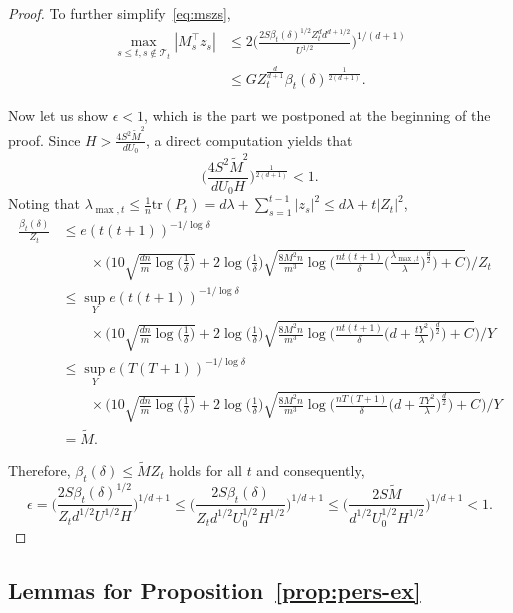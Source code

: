 \documentclass[11pt]{article}
\theoremstyle{plain}
\theoremstyle{definition}
\theoremstyle{remark}
\begin{document}
\begin{proof}
To further simplify~\eqref{eq:mszs}, 
\begin{align*}
     \max_{s\leq t,s\notin \mathcal{T}_{t}}|M_s^{\top}z_s|& \leq 2\bigg(\frac{2S\beta_t(\delta)^{1/2}Z_t^d d^{d+1/2}}{U^{1/2}}\bigg)^{1/(d+1)}\\
     &\leq GZ_t^{\frac{d}{d+1}}\beta_t(\delta)^{\frac{1}{2(d+1)}}.
\end{align*}

Now let us show $\epsilon < 1$, which is the part we postponed at the beginning of the proof.  Since 
$H> \frac{4S^2\tilde{M}^2}{dU_0}$, a direct computation yields that
\[
\bigg(\frac{4S^2{\tilde M}^2}{dU_0H}\bigg)^{\frac{1}{2(d+1)}}<1.
\]
Noting that $\lambda_{\max,t}\leq \frac{1}{n}\mathrm{tr}(P_t)=d\lambda+\sum_{s=1}^{t-1} |z_s|^2 \leq d\lambda+t|Z_t|^2$,
\begin{align*}
\frac{\beta_t(\delta)}{Z_t} &\leq e(t(t+1))^{-1/\log{\delta}}\\
&\quad \quad \times \bigg(10\sqrt{\frac{dn}{m}\log{\bigg(\frac{1}{\delta}\bigg)}}+ 2\log\bigg(\frac{1}{\delta}\bigg) \sqrt{\frac{8M^2n}{m^3}\log \bigg(\frac{nt(t+1)}{\delta}\bigg(\frac{\lambda_{\max,t}}{\lambda}\bigg)^{\frac{d}{2}}\bigg)+C}\bigg)/Z_t\\
&\leq 
\sup_Y e(t(t+1))^{-1/\log{\delta}}\\
&\quad \quad \times \bigg(10\sqrt{\frac{dn}{m}\log{\bigg(\frac{1}{\delta}\bigg)}}+ 2\log\bigg(\frac{1}{\delta}\bigg) \sqrt{\frac{8M^2n}{m^3}\log \bigg(\frac{nt(t+1)}{\delta}\bigg(d+\frac{tY^2}{\lambda}\bigg)^{\frac{d}{2}}\bigg)+C}\bigg)/Y \\
&\leq 
\sup_Y e(T(T+1))^{-1/\log{\delta}}\\
&\quad \quad \times \bigg(10\sqrt{\frac{dn}{m}\log{\bigg(\frac{1}{\delta}\bigg)}}+ 2\log\bigg(\frac{1}{\delta}\bigg) \sqrt{\frac{8M^2n}{m^3}\log \bigg(\frac{nT(T+1)}{\delta}\bigg(d+\frac{TY^2}{\lambda}\bigg)^{\frac{d}{2}}\bigg)+C}\bigg)/Y\\
&=\tilde{M}.
\end{align*}

Therefore, $\beta_t(\delta) \leq \tilde M Z_t$
holds for all $t$ and consequently,
\[
\epsilon  = \bigg(\frac{2S\beta_t(\delta)^{1/2}}{Z_td^{1/2}U^{1/2}H}\bigg)^{1/{d+1}} \leq \bigg(\frac{2S\beta_t(\delta)}{Z_td^{1/2}U_0^{1/2}H^{1/2}}\bigg)^{1/{d+1}} \leq \bigg(\frac{2S\tilde{M}}{d^{1/2}U_0^{1/2}H^{1/2}}\bigg)^{1/{d+1}}<1.
\]
\end{proof}


\subsection{Lemmas for Proposition~\ref{prop:pers-ex}}
\end{document}
